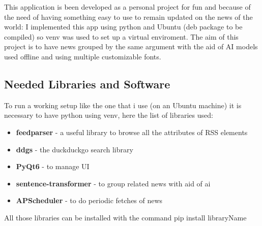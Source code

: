 This application is been developed as a personal project for fun and because
of the need of having something easy to use to remain updated on the news of 
the world: I implemented this app using python and Ubuntu (deb package to be 
compiled) so venv was used to set up a virtual enviroment. The aim of this 
project is to have news grouped by the same argument with the aid of AI models
used offline and using multiple customizable fonts.

\subsection{Needed Libraries and Software}
To run a working setup like the one that i use (on an Ubuntu machine) it is
necessary to have python using venv, here the list of libraries used:
\begin{itemize}
    \item \textbf{feedparser} - a useful library to browse all the attributes 
    of RSS elements
    \item \textbf{ddgs} - the duckduckgo search library
    \item \textbf{PyQt6} - to manage UI
    \item \textbf{sentence-transformer} - to group related news with aid of ai
    \item \textbf{APScheduler} - to do periodic fetches of news
\end{itemize}
All those libraries can be installed with the command pip install libraryName